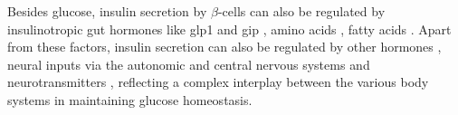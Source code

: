 \par Besides glucose, insulin secretion by $\beta$-cells can also be regulated by insulinotropic gut hormones like \gls{glp1} \textbf{\cite{meloni_glp-1_2013,carlessi_glp-1_2017,macdonald_multiple_2002}} and \gls{gip} \textbf{\cite{seino_gip_2010,christensen_glucose-dependent_2011,irwin_therapeutic_2009}}, amino acids \textbf{\cite{newsholme_amino_2006,newsholme_nutritional_2012}}, fatty acids \textbf{\cite{poitout_fatty_2018,cen_fatty_2016,jezek_fatty_2018,chueire_effect_2020}}. Apart from these factors, insulin secretion can also be regulated by other hormones \textbf{\cite{cheng_follicle-stimulating_2023}}, neural inputs via the autonomic \textbf{\cite{thorens_brain_2011, komatsu_glucosestimulated_2013}} and central nervous systems \textbf{\cite{ruud_neuronal_2017}} and neurotransmitters \textbf{\cite{rodriguez-diaz_neurotransmitters_2014}}, reflecting a complex interplay between the various body systems in maintaining glucose homeostasis. 



